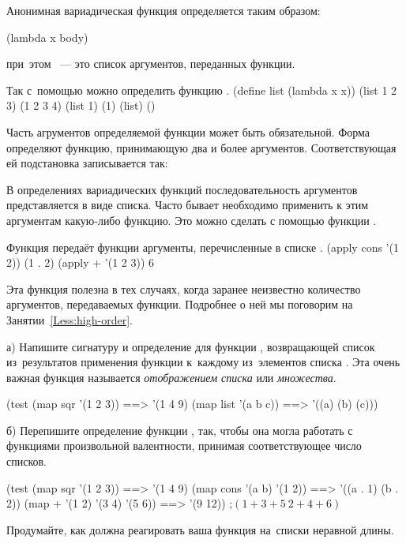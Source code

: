Анонимная вариадическая функция определяется таким образом:
\begin{SchemeCode}[emph={x}]
        (lambda x body) %
\end{SchemeCode}
\noindent при~этом ~--- это список аргументов, переданных функции.

\begin{example}{%
Так с~помощью  можно определить функцию .}
\REPLin
  {(define list (lambda x x))}
\REPL
  {(list 1 2 3)}
  {(1 2 3 4)}
\REPL
  {(list 1)}
  {(1)}
\REPL
  {(list)}
  {()}
\end{example}

\label{variadic-rewrite}Часть агрументов определяемой функции может быть обязательной. Форма  определяют функцию, принимающую два и более аргументов. Соответствующая ей подстановка записывается так: 

В определениях вариадических функций последовательность аргументов представляется в виде списка. Часто бывает необходимо применить к этим аргументам какую-либо функцию. Это можно сделать с помощью функции .

\begin{example}{%
Функция  передаёт функции  аргументы, перечисленные в списке .}
\REPL
  {(apply cons '(1 2))}
  {(1 . 2)}
\REPL
  {(apply + '(1 2 3))}
  {6}
\end{example}

Эта функция полезна в тех случаях, когда заранее неизвестно количество аргументов, передаваемых функции. Подробнее о ней мы поговорим на Занятии~\ref{Less:high-order}.

\begin{Assignment}
а) Напишите сигнатуру и определение для функции , возвращающей список из~результатов применения функции  к~каждому из~элементов списка . Эта очень важная функция называется \emph{отображением списка} или \emph{множества}.
\begin{Specification}
(test 
  (map sqr '(1 2 3))  ==> '(1 4 9)
  (map list '(a b c)) ==> '((a) (b) (c)))
\end{Specification}

б) Перепишите определение функции , так, чтобы она могла работать с функциями произвольной валентности, принимая соответствующее число списков.
\begin{Specification}
(test 
  (map sqr '(1 2 3))  ==> '(1 4 9)
  (map cons '(a b) '(1 2))    ==> '((a . 1) (b . 2))
  (map + '(1 2) '(3 4) '(5 6)) ==> '(9 12)) ;$(1+3+5\ 2+4+6)$
\end{Specification}

Продумайте, как должна реагировать ваша функция на~списки неравной длины.
\end{Assignment}



